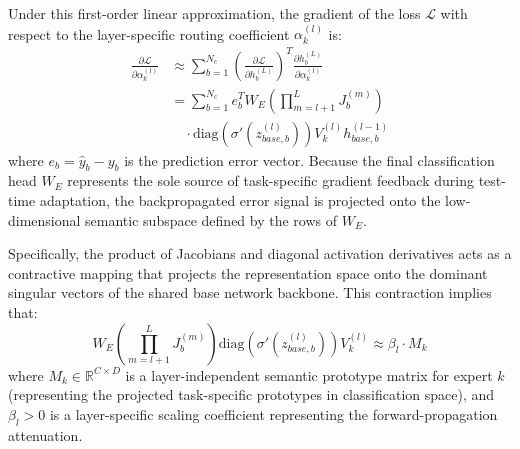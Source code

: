 Under this first-order linear approximation, the gradient of the loss $\mathcal{L}$ with respect to the layer-specific routing coefficient $\alpha_k^{(l)}$ is:
\begin{align}
\frac{\partial \mathcal{L}}{\partial \alpha_k^{(l)}} &\approx \sum_{b=1}^{N_c} \left( \frac{\partial \mathcal{L}}{\partial h_b^{(L)}} \right)^T \frac{\partial h_b^{(L)}}{\partial \alpha_k^{(l)}} \nonumber \\
&= \sum_{b=1}^{N_c} e_b^T W_E \left( \prod_{m=l+1}^L J_b^{(m)} \right) \nonumber \\
&\quad \cdot \text{diag}\left(\sigma'\left(z_{base, b}^{(l)}\right)\right) V_k^{(l)} h_{base, b}^{(l-1)}
\label{eq:grad_approx}
\end{align}
where $e_b = \hat{y}_b - y_b$ is the prediction error vector. Because the final classification head $W_E$ represents the sole source of task-specific gradient feedback during test-time adaptation, the backpropagated error signal is projected onto the low-dimensional semantic subspace defined by the rows of $W_E$.

Specifically, the product of Jacobians and diagonal activation derivatives acts as a contractive mapping that projects the representation space onto the dominant singular vectors of the shared base network backbone. This contraction implies that:
\begin{equation}
W_E \left( \prod_{m=l+1}^L J_b^{(m)} \right) \text{diag}\left(\sigma'\left(z_{base, b}^{(l)}\right)\right) V_k^{(l)} \approx \beta_l \cdot M_k
\label{eq:contraction_assumption}
\end{equation}
where $M_k \in \mathbb{R}^{C \times D}$ is a layer-independent semantic prototype matrix for expert $k$ (representing the projected task-specific prototypes in classification space), and $\beta_l > 0$ is a layer-specific scaling coefficient representing the forward-propagation attenuation. 

